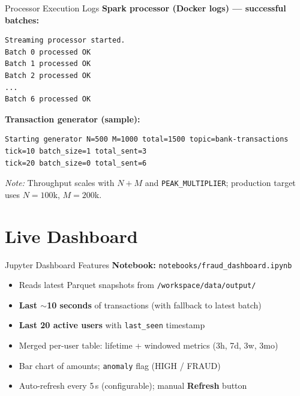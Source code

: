 \documentclass[aspectratio=169,11pt]{beamer}
\begin{document}
\begin{frame}[fragile]{Processor Execution Logs}
  \textbf{Spark processor (Docker logs) — successful batches:}
  \begin{lstlisting}[basicstyle=\ttfamily\footnotesize]
Streaming processor started.
Batch 0 processed OK
Batch 1 processed OK
Batch 2 processed OK
...
Batch 6 processed OK
  \end{lstlisting}
  \textbf{Transaction generator (sample):}
  \begin{lstlisting}[basicstyle=\ttfamily\footnotesize]
Starting generator N=500 M=1000 total=1500 topic=bank-transactions
tick=10 batch_size=1 total_sent=3
tick=20 batch_size=0 total_sent=6
  \end{lstlisting}
  \textit{Note:} Throughput scales with $N{+}M$ and \texttt{PEAK\_MULTIPLIER}; production target uses $N{=}100$k, $M{=}200$k.
\end{frame}

\section{Live Dashboard}

\begin{frame}{Jupyter Dashboard Features}
  \textbf{Notebook:} \texttt{notebooks/fraud\_dashboard.ipynb}
  \begin{itemize}
    \item Reads latest Parquet snapshots from \texttt{/workspace/data/output/}
    \item \textbf{Last $\sim$10 seconds} of transactions (with fallback to latest batch)
    \item \textbf{Last 20 active users} with \texttt{last\_seen} timestamp
    \item Merged per-user table: lifetime + windowed metrics (3h, 7d, 3w, 3mo)
    \item Bar chart of amounts; \texttt{anomaly} flag (HIGH / FRAUD)
    \item Auto-refresh every 5\,s (configurable); manual \textbf{Refresh} button
  \end{itemize}
\end{frame}
\end{document}
